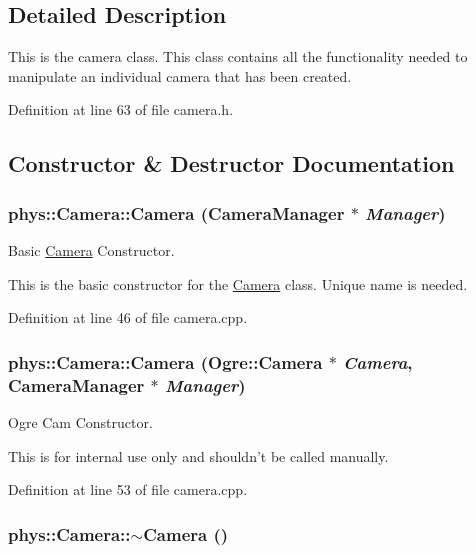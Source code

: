 \subsection{Detailed Description}
This is the camera class. This class contains all the functionality needed to manipulate an individual camera that has been created. 

Definition at line 63 of file camera.h.



\subsection{Constructor \& Destructor Documentation}
\hypertarget{classphys_1_1Camera_a1309e4191b22440035e360c205b81472}{
\subsubsection[{Camera}]{\setlength{\rightskip}{0pt plus 5cm}phys::Camera::Camera ({\bf CameraManager} $\ast$ {\em Manager})}}
\label{d9/df8/classphys_1_1Camera_a1309e4191b22440035e360c205b81472}


Basic \hyperlink{classphys_1_1Camera}{Camera} Constructor. 

This is the basic constructor for the \hyperlink{classphys_1_1Camera}{Camera} class. Unique name is needed. 

Definition at line 46 of file camera.cpp.

\hypertarget{classphys_1_1Camera_a0510d4f9bf6fb195115272cbd116e8dd}{
\subsubsection[{Camera}]{\setlength{\rightskip}{0pt plus 5cm}phys::Camera::Camera (Ogre::Camera $\ast$ {\em Camera}, \/  {\bf CameraManager} $\ast$ {\em Manager})}}
\label{d9/df8/classphys_1_1Camera_a0510d4f9bf6fb195115272cbd116e8dd}


Ogre Cam Constructor. 

This is for internal use only and shouldn't be called manually. 

Definition at line 53 of file camera.cpp.

\hypertarget{classphys_1_1Camera_aa45f340a6f7ba0970aa2602a928463ea}{
\subsubsection[{$\sim$Camera}]{\setlength{\rightskip}{0pt plus 5cm}phys::Camera::$\sim$Camera ()}}
\label{d9/df8/classphys_1_1Camera_aa45f340a6f7ba0970aa2602a928463ea}


